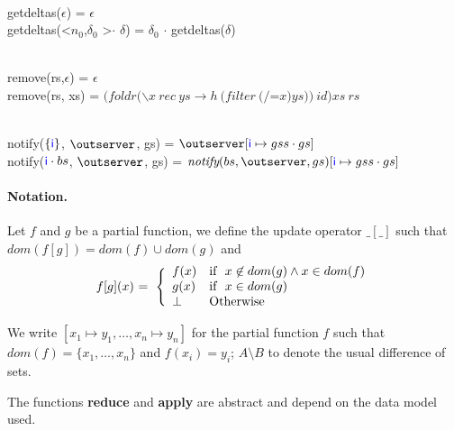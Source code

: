\begin{flushleft}
 \\
getdeltas($\epsilon$) = $\epsilon$ \\
getdeltas(\textless $n_0$,$\delta_0$ \textgreater $\cdot$ $\delta$) = $\delta_0$ $\cdot$ getdeltas($\delta$)\\
\end{flushleft}

\begin{flushleft}
 \\
remove(rs,$\epsilon$) = $\epsilon$ \\
remove(rs, xs) = $(foldr (\backslash x\ rec\ ys\to h \ (filter \ (/$=$x) ys))\ id) xs \ rs$\\
\end{flushleft}


\begin{flushleft}
\\
notify($\{\textcolor{blue}{{\sf i}}\}$, $\outserver$, gs) = $\outserver[\cid \mapsto gss \cdot gs]$\\
notify($\textcolor{blue}{{\sf i}} \cdot bs$, $\outserver$, gs) = $\notify{bs}{\outserver}{gs}[\cid \mapsto gss \cdot gs]$ 
\end{flushleft}



\normalfont
\normalsize

\paragraph{Notation.} Let $f$ and $g$ be a partial function, we define the update operator $\_[\_]$ such that
  $dom(f[g])  = dom(f) \cup dom(g)$ and 
 \[
   \begin{array}{l@{\ = \ \Bigg\{}l}
     f[g](x) & 
     \begin{array}{ll}
        f(x) & \mbox{if }\ x\not\in dom(g) \wedge x\in dom(f) \\
        g(x) & \mbox{if }\ x\in dom(g)\\
        \mathit{\undefined}  & \mbox{Otherwise} 
     \end{array}
   \end{array}
 \]    

 We write $[x_1 \mapsto y_1, \ldots, x_n \mapsto y_n]$ for the partial function $f$ such that $dom(f)=\{x_1,\ldots,x_n\}$ and $f(x_i)=y_i$; $A \setminus B$ to denote the usual difference of sets.



The functions \textbf{reduce} and \textbf{apply} are abstract and depend on the data model used. 

